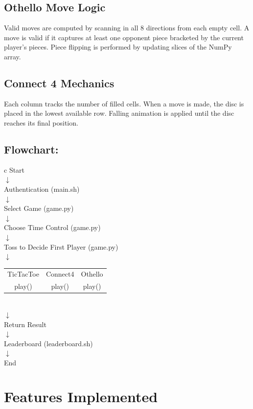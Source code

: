 \documentclass[12pt]{article}
\begin{document}
\subsection{Othello Move Logic}
Valid moves are computed by scanning in all 8 directions from each empty cell. A move is valid if it captures at least one opponent piece bracketed by the current player's pieces. Piece flipping is performed by updating slices of the NumPy array.

\subsection{Connect 4 Mechanics}
Each column tracks the number of filled cells. When a move is made, the disc is placed in the lowest available row. Falling animation is applied until the disc reaches its final position.

\subsection{Flowchart:}

\begin{center}
\begin{tabular}{c}
Start \\
$\downarrow$ \\
Authentication (main.sh) \\
$\downarrow$ \\
Select Game (game.py)\\
$\downarrow$ \\
Choose Time Control (game.py)\\
$\downarrow$ \\
Toss to Decide First Player (game.py)\\
$\downarrow$ \\
\begin{tabular}{ccc}
TicTacToe & Connect4 & Othello \\
play() & play() & play()
\end{tabular} \\
$\downarrow$ \\
Return Result \\
$\downarrow$ \\
Leaderboard (leaderboard.sh) \\
$\downarrow$ \\
End
\end{tabular}
\end{center}

\section{Features Implemented}
\end{document}
